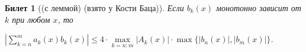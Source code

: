 \documentclass[11pt,a4paper,oneside]{scrartcl}
\newtheorem{ticket}{Билет}
\begin{document}
\addtocounter{ticket}{-1}
\begin{ticket}[(с леммой) (взято у Кости Баца)]
    Если $b_k(x)$ монотонно зависит от $k$ при любом $x$, то

    $\left| \sum_{k = n}^m a_k(x) b_k(x)\right| \leqslant 4 \cdot
    \underset{k = n:m}{\max} \left| A_k(x) \right| \cdot \max
    \{|b_n(x)|, |b_m(x) | \}$.
\end{ticket}
\end{document}
